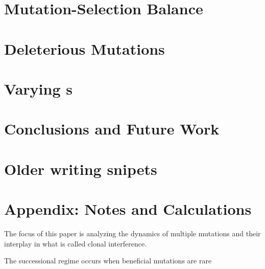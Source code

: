 \documentclass[12pt,twocolumn]{article}
\begin{document}
\section{Mutation-Selection Balance}

\section{Deleterious Mutations}

\section{Varying s}

\section{Conclusions and Future Work}


\section*{Older writing snipets}






\section*{Appendix: Notes and Calculations}
The focus of this paper is analyzing the dynamics of multiple mutations and their interplay in what is called clonal interference.  

The successional regime occurs when beneficial mutations are rare




\end{document}
